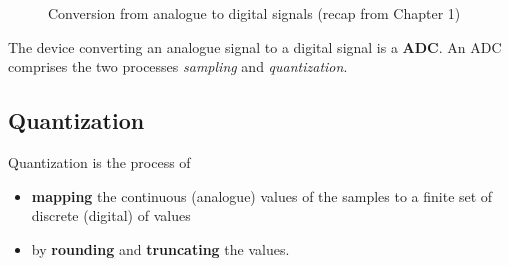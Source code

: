 \begin{refsection}
\begin{figure}[H]
\begin{adjustbox}{scale=0.8}
	\end{adjustbox}
	\caption{Conversion from analogue to digital signals (recap from Chapter 1)}
	\label{fig:ch04:signals_sampling_recap}
\end{figure}

The device converting an analogue signal to a digital signal is a  \textbf{\ac{ADC}}. An \ac{ADC} comprises the two processes \emph{sampling} and \emph{quantization}.

\subsection{Quantization}

Quantization is the process of
\begin{itemize}
	\item \textbf{mapping} the continuous (analogue) values of the samples to a finite set of discrete (digital) of values
	\item by \textbf{rounding} and \textbf{truncating} the values.
\end{itemize}


\end{refsection}
